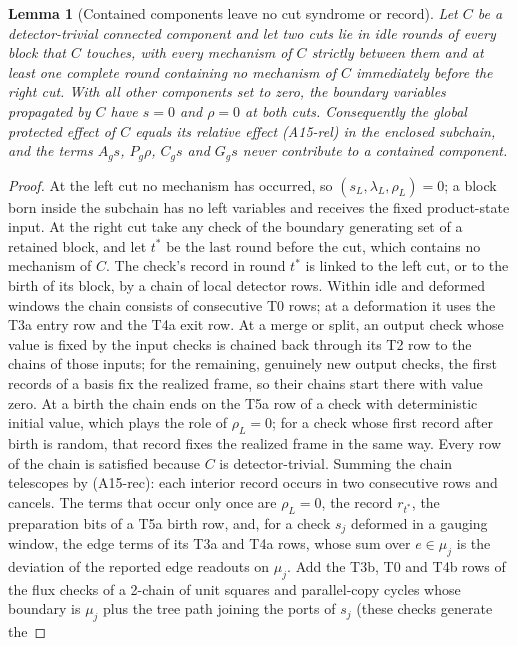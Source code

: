 \documentclass[aps,prx,reprint,superscriptaddress,nofootinbib,floatfix,longbibliography]{revtex4-2}
\newtheorem{lemma}[theorem]{Lemma}
\theoremstyle{definition}
\begin{document}
\begin{lemma}[Contained components leave no cut syndrome or record]
\label{lem:contained-cut}
Let $C$ be a detector-trivial connected component and let two cuts lie in
idle rounds of every block that $C$ touches, with every mechanism of $C$
strictly between them and at least one complete round containing no mechanism
of $C$ immediately before the right cut.  With all other components set to
zero, the boundary variables propagated by $C$ have $s=0$ and $\rho=0$ at both
cuts.  Consequently the global protected effect of $C$ equals its relative
effect (A15-rel) in the enclosed subchain, and the terms $A_gs$, $P_g\rho$,
$C_gs$ and $G_gs$ never contribute to a contained component.
\end{lemma}
\begin{proof}
At the left cut no mechanism has occurred, so $(s_L,\lambda_L,\rho_L)=0$; a
block born inside the subchain has no left variables and receives the fixed
product-state input.  At the right cut take any check of the boundary
generating set of a retained block, and let $t^\ast$ be the last round before
the cut, which contains no mechanism of $C$.  The check's record in round
$t^\ast$ is linked to the left cut, or to the birth of its block, by a chain of
local detector rows.  Within idle and deformed windows the chain consists of
consecutive T0 rows; at a deformation it uses the T3a entry row and the T4a
exit row.  At a merge or split, an output check whose value is fixed by the
input checks is chained back through its T2 row to the chains of those
inputs; for the remaining, genuinely new output checks, the first records of
a basis fix the realized frame, so their chains start there with value zero.
At a birth the chain ends on the T5a row of a check with deterministic
initial value, which plays the role of $\rho_L=0$; for a check whose first
record after birth is random, that record fixes the realized frame in the
same way.  Every
row of the chain is satisfied because $C$ is detector-trivial.  Summing the
chain telescopes by (A15-rec): each interior record occurs in two
consecutive rows and cancels.  The terms that occur only once are
$\rho_L=0$, the record $r_{t^\ast}$, the preparation bits of a T5a birth row,
and, for a check $s_j$ deformed in a gauging window, the edge terms of its T3a
and T4a rows, whose sum over $e\in\mu_j$ is the deviation of the reported edge
readouts on $\mu_j$.  Add the T3b, T0 and T4b rows of the flux checks of a
2-chain of unit squares and parallel-copy cycles whose boundary is $\mu_j$
plus the tree path joining the ports of $s_j$ (these checks generate the

\end{proof}
\end{document}
